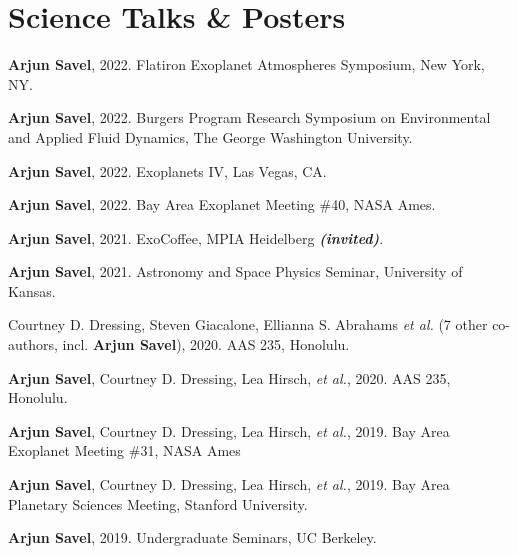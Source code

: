 \documentclass[letterpaper,12pt]{article}
\newcommand{\resumeSubHeadingListStart}{\begin{itemize}[leftmargin=*]}
\newcommand{\shorterSection}[1]{\vspace{-10pt}\section{#1}}
\begin{document}
\shorterSection{Science Talks \& Posters}
\small
  \begin{list}{}{\cvlist}

\item[{\color{numcolor}\scriptsize14}] \textbf{Arjun Savel}, 2022. Flatiron Exoplanet Atmospheres Symposium, New York, NY.

\item[{\color{numcolor}\scriptsize13}] \textbf{Arjun Savel}, 2022. Burgers Program Research Symposium on Environmental and Applied Fluid Dynamics, The George Washington University.

\item[{\color{numcolor}\scriptsize12}] \textbf{Arjun Savel}, 2022. Exoplanets IV, Las Vegas, CA.


\item[{\color{numcolor}\scriptsize11}] \textbf{Arjun Savel}, 2022. Bay Area Exoplanet Meeting \#40, NASA Ames.
  
 \item[{\color{numcolor}\scriptsize10}] \textbf{Arjun Savel}, 2021. ExoCoffee, MPIA Heidelberg \textbf{\textit{(invited)}}.
  
\item[{\color{numcolor}\scriptsize9}] \textbf{Arjun Savel}, 2021. Astronomy and Space Physics Seminar, University of Kansas.

  
\item[{\color{numcolor}\scriptsize8}] Courtney D. Dressing, Steven Giacalone, Ellianna S. Abrahams \emph{et al.} (7 other co-authors, incl. \textbf{Arjun Savel}), 2020. AAS 235, Honolulu.

\item[{\color{numcolor}\scriptsize7}] \textbf{Arjun Savel}, Courtney D. Dressing, Lea Hirsch, \emph{et al.}, 2020. AAS 235, Honolulu.

\item[{\color{numcolor}\scriptsize6}] \textbf{Arjun Savel}, Courtney D. Dressing, Lea Hirsch, \emph{et al.}, 2019. Bay Area Exoplanet Meeting \#31, NASA Ames

\item[{\color{numcolor}\scriptsize5}] \textbf{Arjun Savel}, Courtney D. Dressing, Lea Hirsch, \emph{et al.}, 2019. Bay Area Planetary Sciences Meeting, Stanford University.

\item[{\color{numcolor}\scriptsize4}] \textbf{Arjun Savel}, 2019. Undergraduate Seminars, UC Berkeley.


\end{list}
\end{document}
